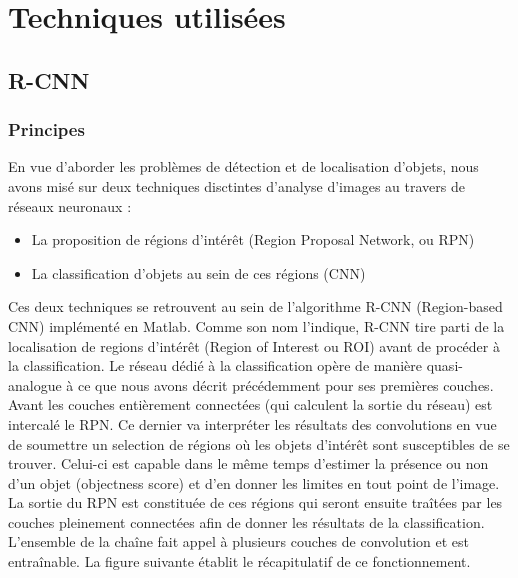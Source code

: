 \chapter{Techniques utilisées}

   \section{R-CNN}

    \subsection{Principes}
      
      En vue d'aborder les problèmes de détection et de localisation d'objets, nous avons misé sur deux techniques disctintes d'analyse d'images au travers de réseaux neuronaux : 
      \begin{itemize}
       \item La proposition de régions d'intérêt (Region Proposal Network, ou RPN)
       \item La classification d'objets au sein de ces régions (CNN)
      \end{itemize}
      
      Ces deux techniques se retrouvent au sein de l'algorithme R-CNN\cite{Bib_RCNN} (Region-based CNN) implémenté en Matlab.
      Comme son nom l'indique, R-CNN tire parti de la localisation de regions d'intérêt (Region of Interest ou ROI) avant de procéder à la classification. 
      Le réseau dédié à la classification opère de manière quasi-analogue à ce que nous avons décrit précédemment pour ses premières couches. Avant les couches entièrement connectées (qui calculent
      la sortie du réseau) est intercalé le RPN. 
      Ce dernier va interpréter les résultats des convolutions en vue de soumettre un selection de régions où les objets d'intérêt sont susceptibles de se trouver. 
      Celui-ci est capable dans le même temps d'estimer la présence ou non d'un objet (objectness score) et d'en donner les limites en tout point de l'image. 
      La sortie du RPN est constituée de ces régions qui seront ensuite traîtées par les couches pleinement connectées afin de donner les résultats de la classification. 
      L'ensemble de la chaîne fait appel à plusieurs couches de convolution et est entraînable. 
      La figure suivante établit le récapitulatif de ce fonctionnement.  
      
